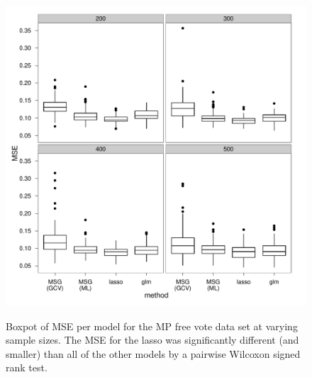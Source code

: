 \begin{figure}
\centering
\includegraphics[width=6in]{gds/figs/mp-mse.pdf} \\
\caption{Boxpot of MSE per model for the MP free vote data set at varying sample sizes. The MSE for the lasso was significantly different (and smaller) than all of the other models by a pairwise Wilcoxon signed rank test.}
\label{gds-mps-mse}
\end{figure}

